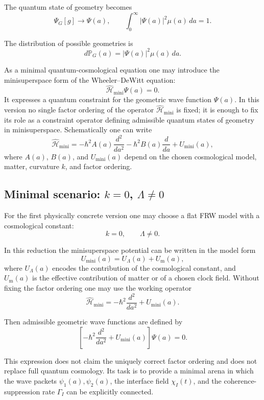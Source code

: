 \documentclass[12pt,a4paper]{article}
\newcommand{\Prob}{\mathbb P}
\begin{document}
The quantum state of geometry becomes
\[
\boxed{
\Psi_G[g]
\longrightarrow
\Psi(a),
\qquad
\int_0^\infty |\Psi(a)|^2\mu(a)\,da=1.
}
\]

The distribution of possible geometries is
\[
\boxed{
d\Prob_G(a)=|\Psi(a)|^2\mu(a)\,da.
}
\]

As a minimal quantum-cosmological equation one may introduce the minisuperspace form of the Wheeler--DeWitt equation:
\[
\boxed{
\widehat{\mathcal H}_{\mathrm{mini}}\Psi(a)=0.
}
\]
It expresses a quantum constraint for the geometric wave function $\Psi(a)$. In this version no single factor ordering of the operator $\widehat{\mathcal H}_{\mathrm{mini}}$ is fixed; it is enough to fix its role as a constraint operator defining admissible quantum states of geometry in minisuperspace. Schematically one can write
\[
\boxed{
\widehat{\mathcal H}_{\mathrm{mini}}
=
-\hbar^2 A(a)\frac{d^2}{da^2}
-\hbar^2 B(a)\frac{d}{da}
+U_{\mathrm{mini}}(a),
}
\]
where $A(a)$, $B(a)$, and $U_{\mathrm{mini}}(a)$ depend on the chosen cosmological model, matter, curvature $k$, and factor ordering.

\subsection{Minimal scenario: \texorpdfstring{$k=0$, $\Lambda\neq0$}{k=0, Lambda nonzero}}

For the first physically concrete version one may choose a flat FRW model with a cosmological constant:
\[
\boxed{
k=0,
\qquad
\Lambda\neq0.
}
\]

In this reduction the minisuperspace potential can be written in the model form
\[
\boxed{
U_{\mathrm{mini}}(a)
=
U_\Lambda(a)+U_{\mathrm{m}}(a),
}
\]
where $U_\Lambda(a)$ encodes the contribution of the cosmological constant, and $U_{\mathrm{m}}(a)$ is the effective contribution of matter or of a chosen clock field. Without fixing the factor ordering one may use the working operator
\[
\boxed{
\widehat{\mathcal H}_{\mathrm{mini}}
=
-\hbar^2\frac{d^2}{da^2}
+U_{\mathrm{mini}}(a).
}
\]

Then admissible geometric wave functions are defined by
\[
\boxed{
\left[-\hbar^2\frac{d^2}{da^2}+U_{\mathrm{mini}}(a)\right]\Psi(a)=0.
}
\]

This expression does not claim the uniquely correct factor ordering and does not replace full quantum cosmology. Its task is to provide a minimal arena in which the wave packets $\psi_1(a),\psi_2(a)$, the interface field $\chi_I(t)$, and the coherence-suppression rate $\Gamma_I$ can be explicitly connected.
\end{document}
